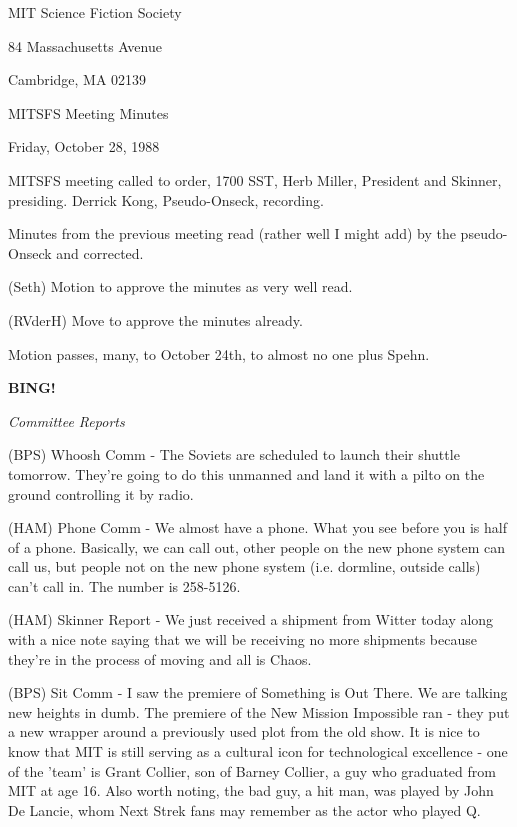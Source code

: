 \documentclass[12pt]{article}
\newcommand{\bing}{{\bf BING!} }
\newcommand{\goto}[1]{\bing \vskip 12pt \centerline{{\em{#1}}}}
\begin{document}
\begin{center}

MIT Science Fiction Society 

84 Massachusetts Avenue

Cambridge, MA 02139

\vspace{12pt}

MITSFS Meeting Minutes 

Friday, October 28, 1988

\end{center}
 
\vspace{18pt}

\setlength{\parskip}{6pt}

\noindent
MITSFS meeting called to order, 1700 SST, Herb Miller, President and Skinner, presiding. Derrick Kong, Pseudo-Onseck, recording.

Minutes from the previous meeting read (rather well I might add) by the pseudo-Onseck and corrected.

(Seth) Motion to approve the minutes as very well read.

(RVderH) Move to approve the minutes already.

Motion passes, many, to October 24th, to almost no one plus Spehn.

\goto{Committee Reports}

(BPS) Whoosh Comm - The Soviets are scheduled to launch their shuttle tomorrow. They're going to do this unmanned and land it with a pilto on the ground controlling it by radio.

(HAM) Phone Comm - We almost have a phone. What you see before you is half of a phone. Basically, we can call out, other people on the new phone system can call us, but people not on the new phone system (i.e. dormline, outside calls) can't call in. The number is 258-5126.

(HAM) Skinner Report - We just received a shipment from Witter today along with a nice note saying that we will be receiving no more shipments because they're in the process of moving and all is Chaos.

(BPS) Sit Comm - I saw the premiere of Something is Out There. We are talking new heights in dumb. The premiere of the New Mission Impossible ran - they put a new wrapper around a previously used plot from the old show. It is nice to know that MIT is still serving as a cultural icon for technological excellence - one of the 'team' is Grant Collier, son of Barney Collier, a guy who graduated from MIT at age 16. Also worth noting, the bad guy, a hit man, was played by John De Lancie, whom Next Strek fans may remember as the actor who played Q.
\end{document}
